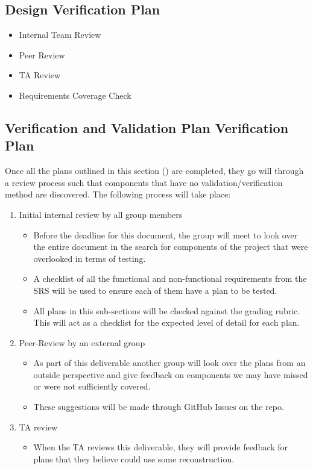 \documentclass[12pt, titlepage]{article}
\begin{document}
\subsection{Design Verification Plan}

\begin{itemize}
    \item Internal Team Review
    \item Peer Review
    \item TA Review
    \item Requirements Coverage Check
\end{itemize}

\subsection{Verification and Validation Plan Verification Plan}
\label{ssub:vnv_plan_verificaiton_plan}

Once all the plans outlined in this section () are completed, they go will through a review process such that components that have no validation/verification method are discovered. The following process will take place:

\begin{enumerate}
    \item Initial internal review by all group members
    \begin{itemize}
        \item Before the deadline for this document, the group will meet to look over the entire document in the search for components of the project that were overlooked in terms of testing.
        \item A checklist of all the functional and non-functional requirements from the SRS will be used to ensure each of them have a plan to be tested.
        \item All plans in this sub-sections will be checked against the grading rubric. This will act as a checklist for the expected level of detail for each plan.
    \end{itemize}
    \item Peer-Review by an external group
    \begin{itemize}
        \item As part of this deliverable another group will look over the plans from an outside perspective and give feedback on components we may have missed or were not sufficiently covered.
        \item These suggestions will be made through GitHub Issues on the repo.
    \end{itemize}
    \item TA review
    \begin{itemize}
        \item When the TA reviews this deliverable, they will provide feedback for plans that they believe could use some reconstruction.
    \end{itemize}
\end{enumerate}
\end{document}
